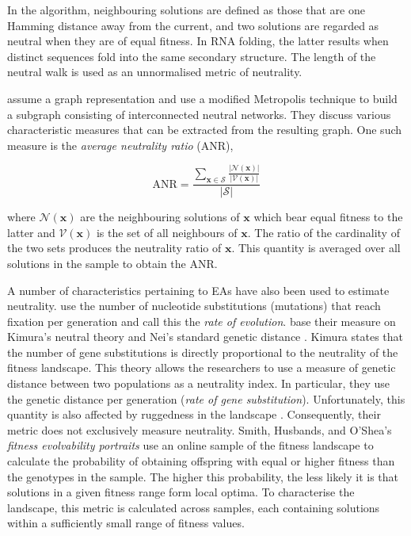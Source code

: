 \documentclass[conference]{IEEEtran}
\renewcommand{\vec}[1]{\mathbf{#1}}
\begin{document}
In the algorithm, neighbouring solutions are defined as those that are one Hamming distance away from the current, and two solutions are regarded as neutral when they are of equal fitness. In RNA folding, the latter results when distinct sequences fold into the same secondary structure. The length of the neutral walk is used as an unnormalised metric of neutrality. 

\citet{vanneschi2006quantitative} assume a graph representation and use a modified Metropolis technique to build a subgraph consisting of interconnected neutral networks. They discuss various characteristic measures that can be extracted from the resulting graph. One such measure is the \textit{average neutrality ratio} (ANR),

\begin{equation}
\label{eqAvgNeutralityRatio}	
	\text{ANR} = \frac{\sum_{\vec{x} \in \mathcal{S}}^{} \frac{\lvert \mathcal{N}(\vec{x}) \rvert}{\lvert \mathcal{V}(\vec{x}) \rvert}}{\lvert \mathcal{S} \rvert}
\end{equation} 

where $\mathcal{N}(\vec{x})$ are the neighbouring solutions of $\vec{x}$ which bear equal fitness to the latter and $\mathcal{V}(\vec{x})$ is the set of all neighbours of $\vec{x}$. The ratio of the cardinality of the two sets produces the neutrality ratio of  $\vec{x}$. This quantity is averaged over all solutions in the sample to obtain the ANR.

A number of characteristics pertaining to EAs have also been used to estimate neutrality. \citet{huynen1996smoothness} use the number of nucleotide substitutions (mutations) that reach fixation per generation and call this the \textit{rate of evolution}. \citet{katada2003measuring} base their measure on Kimura's neutral theory \cite{kimura1984neutral} and Nei's standard genetic distance \cite{nei1972genetic}. Kimura states that the number of gene substitutions is directly proportional to the neutrality of the fitness landscape. This theory allows the researchers to use a measure of genetic distance between two populations as a neutrality index. In particular, they use the genetic distance per generation (\textit{rate of gene substitution}). Unfortunately, this quantity is also affected by ruggedness in the landscape \cite{katada2003measuring}. Consequently, their metric does not exclusively measure neutrality. Smith, Husbands, and O'Shea's \textit{fitness evolvability portraits} \cite{smith2002fitness} use an online sample of the fitness landscape to calculate the probability of obtaining offspring with equal or higher fitness than the genotypes in the sample. The higher this probability, the less likely it is that solutions in a given fitness range form local optima. To characterise the landscape, this metric is calculated across samples, each containing solutions within a sufficiently small range of fitness values.
\end{document}
